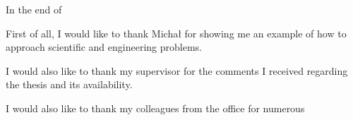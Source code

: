 
In the end of 

First of all, I would like to thank Michał for showing me an example of how to approach scientific and engineering problems.

I would also like to thank my supervisor for the comments I received regarding the thesis and its availability.

I would also like to thank my colleagues from the office for numerous

